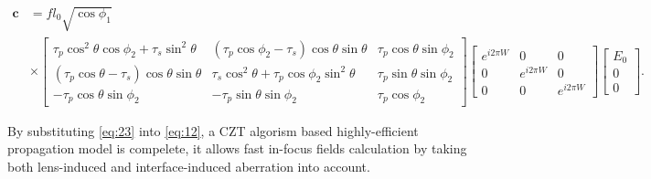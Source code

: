 \documentclass[9pt,twocolumn,twoside]{osajnl}
\begin{document}
\begin{strip}
	\begin{equation}
		\begin{aligned}\label{eq:23}
			\mathbf{c}&=f l_0\sqrt{\cos\phi_1}\\
			&\times\begin{bmatrix}
				\tau_p\cos^2\theta\cos\phi_2+\tau_s\sin^2\theta& (\tau_p\cos\phi_2-\tau_s)\cos\theta\sin\theta& \tau_p\cos\theta\sin\phi_2\\
				(\tau_p\cos\theta-\tau_s)\cos\theta\sin\theta& \tau_s\cos^2\theta+\tau_p\cos\phi_2\sin^2\theta& \tau_p\sin\theta\sin\phi_2\\
				-\tau_p\cos\theta\sin\phi_2& -\tau_p\sin\theta\sin\phi_2& \tau_p\cos\phi_2
				\end{bmatrix}
				\begin{bmatrix}
					e^{i2\pi W}&0&0\\
					0&e^{i2\pi W}&0\\
					0&0&e^{i2\pi W}
				\end{bmatrix}
				\begin{bmatrix}
					E_0\\
					0\\
					0
				\end{bmatrix}.
		\end{aligned}
	\end{equation}	
\end{strip}

By substituting \eqref{eq:23} into \eqref{eq:12}, a CZT algorism based highly-efficient propagation model is compelete, it allows fast in-focus fields calculation by taking both lens-induced and interface-induced aberration into account.
\end{document}
